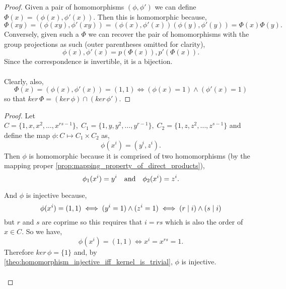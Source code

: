 \documentclass[MathsNotesBase.tex]{subfiles}
\begin{document}
{	
	\begin{proof}
		Given a pair of homomorphisms ${ (\phi,\phi') }$ we can define ${ \Phi(x) = (\phi(x), \phi'(x)) }$. Then this is homomorphic because,
		\[ \Phi(xy) = (\phi(xy), \phi'(xy)) = (\phi(x), \phi'(x))(\phi(y), \phi'(y)) = \Phi(x)\Phi(y). \]
		Conversely, given such a $\Phi$ we can recover the pair of homomorphisms with the group projections as such (outer parentheses omitted for clarity),
		\[ \phi(x), \phi'(x) = p(\Phi(x)), p'(\Phi(x)). \]
		Since the correspondence is invertible, it is a bijection.\\\\
		Clearly, also, 
		\[ \Phi(x) = (\phi(x), \phi'(x)) = (1,1) \iff (\phi(x) = 1) \wedge (\phi'(x) = 1) \]
		so that ${ ker\,\Phi = (ker\,\phi) \cap (ker\,\phi') }$.
	\end{proof}	

	\bigskip
	\begin{proof}
		Let ${ C = \{1,x,x^2,\dots,x^{rs-1}\},\; C_1 = \{1,y,y^2,\dots,y^{r-1}\},\; C_2 = \{1,z,z^2,\dots,z^{s-1}\} }$ and define the map ${ \phi: C \longmapsto C_1 \times C_2 }$ as,
		\[ \phi(x^i) = (y^i, z^i). \]
		Then $\phi$ is homomorphic because it is comprised of two homomorphisms (by the mapping proper \autoref{prop:mapping_property_of_direct_products}),
		\[ \phi_1(x^i) = y^i \hspace{10pt}\text{and}\hspace{10pt} \phi_2(x^i) = z^i. \]
		
		And $\phi$ is injective because,
		\[ \phi(x^i) = (1,1) \iff (y^i = 1) \wedge (z^i = 1) \iff (r \mid i) \wedge (s \mid i) \]
		but $r$ and $s$ are coprime so this requires that ${ i = rs }$ which is also the order of ${ x \in C }$. So we have,
		\[ \phi(x^i) = (1,1) \iff x^i = x^{rs} = 1. \]
		Therefore ${ ker\,\phi = \{1\} }$ and, by \autoref{theo:homomorphism_injective_iff_kernel_is_trivial}, $\phi$ is injective.\\\\
		

\end{proof}}
\end{document}
